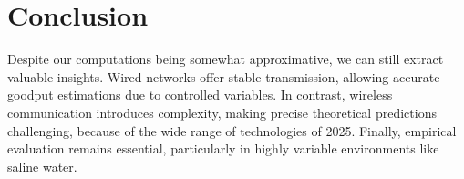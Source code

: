 \section{Conclusion}
\label{sec:conclusion}



Despite our computations being somewhat approximative, we can still extract valuable insights.
Wired networks offer stable transmission, allowing accurate goodput estimations due to controlled variables. In contrast, wireless communication introduces complexity, making precise theoretical predictions challenging, because of the wide range of technologies of 2025. Finally, empirical evaluation remains essential, particularly in highly variable environments like saline water. 



